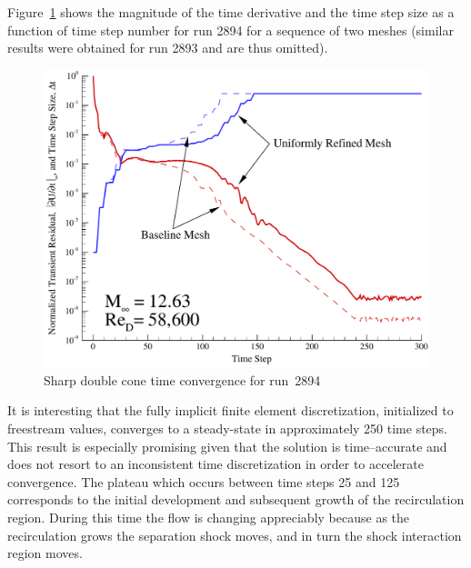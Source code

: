 Figure~\ref{fig:aedc_double_cone_2894_time_convergence} shows the magnitude of the time derivative and the time step size as a function of time step number for run 2894 for a sequence of two meshes (similar results were obtained for run 2893 and are thus omitted).
\begin{figure}[hbtp]
  \begin{center}
    \includegraphics[width=\textwidth]{figures/aedc_double_cone/2894/resid_history}
    \caption{Sharp double cone time convergence for run~2894\label{fig:aedc_double_cone_2894_time_convergence}}
  \end{center}
\end{figure}
It is interesting that the fully implicit finite element discretization, initialized to freestream values, converges to a steady-state in approximately 250 time steps.  This result is especially promising given that the solution is time--accurate and does not resort to an inconsistent time discretization in order to accelerate convergence.  The plateau which occurs between time steps 25 and 125 corresponds to the initial development and subsequent growth of the recirculation region.  During this time the flow is changing appreciably because as the recirculation grows the separation shock moves, and in turn the shock interaction region moves.  


